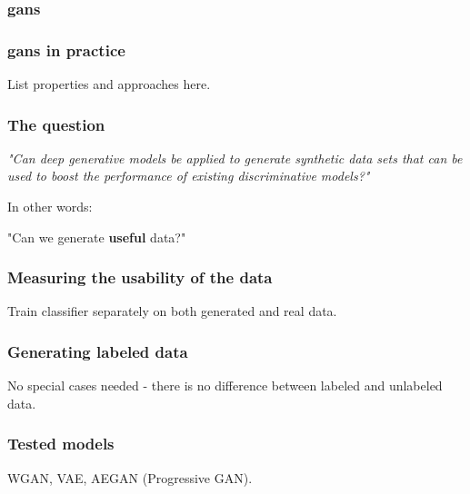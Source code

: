 \documentclass{beamer}
\begin{document}
\begin{messageframe}
    \frametitle{\acrfull{gans}}
\end{messageframe}

\begin{messageframe}
    \frametitle{\acrshort{gans} in practice}
    List properties and approaches here.
\end{messageframe}


\begin{messageframe}
    \frametitle{The question}
    \textit{"Can deep generative models be applied to generate synthetic data sets that can be used to boost the performance of existing discriminative models?"}
    
    \vspace{1.5cm}
    
    In other words:

    "Can we generate \textbf{useful} data?"
\end{messageframe}

\begin{messageframe}
    \frametitle{Measuring the usability of the data}
    Train classifier separately on both generated and real data.
\end{messageframe}

\begin{messageframe}
    \frametitle{Generating labeled data}
    No special cases needed - there is no difference between labeled and unlabeled data.
\end{messageframe}


\begin{messageframe}
    \frametitle{Tested models}
    WGAN, VAE, AEGAN (Progressive GAN).
\end{messageframe}



\end{document}
